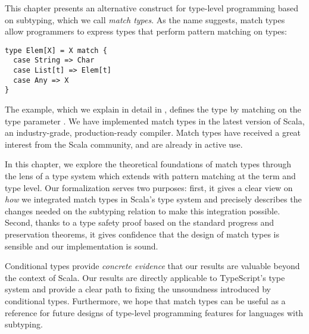 This chapter presents an alternative construct for type-level programming based on subtyping, which we call \emph{match types}.
As the name suggests, match types allow programmers to express types that perform pattern matching on types:
%
\begin{lstlisting}
type Elem[X] = X match {
  case String => Char
  case List[t] => Elem[t]
  case Any => X
}
\end{lstlisting}
%
The example, which we explain in detail in , defines the type  by matching on the type parameter .
%
We have implemented match types in the latest version of Scala, an industry-grade, production-ready compiler.
Match types have received a great interest from the Scala community, and are already in active use.

In this chapter, we explore the theoretical foundations of match types through the lens of a type system which extends \SystemFsub with pattern matching at the term and type level.
%
Our formalization serves two purposes: first, it gives a clear view on \emph{how} we integrated match types in Scala's type system and precisely describes the changes needed on the subtyping relation to make this integration possible. Second, thanks to a type safety proof based on the standard progress and preservation theorems, it gives confidence that the design of match types is sensible and our implementation is sound.

Conditional types provide \emph{concrete evidence} that our results are valuable beyond the context of Scala.
Our results are directly applicable to TypeScript's type system and provide a clear path to fixing the unsoundness introduced by conditional types.
Furthermore, we hope that match types can be useful as a reference for future designs of type-level programming features for languages with subtyping.


